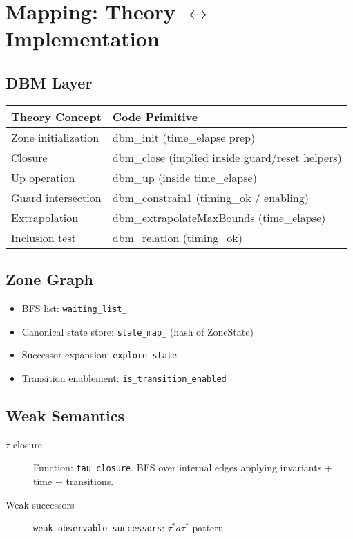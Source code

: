 \section{Mapping: Theory \texorpdfstring{$\leftrightarrow$}{<->} Implementation}
\subsection{DBM Layer}
\begin{tabular}{ll}
Theory Concept & Code Primitive \\\hline
Zone initialization & dbm\_init \newline (time\_elapse prep) \\
Closure & dbm\_close (implied inside guard/reset helpers) \\
Up operation & dbm\_up (inside time\_elapse) \\
Guard intersection & dbm\_constrain1 (timing\_ok / enabling) \\
Extrapolation & dbm\_extrapolateMaxBounds (time\_elapse) \\
Inclusion test & dbm\_relation (timing\_ok) \\
\end{tabular}

\subsection{Zone Graph}
\begin{itemize}
  \item BFS list: \texttt{waiting\_list\_}
  \item Canonical state store: \texttt{state\_map\_} (hash of ZoneState)
  \item Successor expansion: \texttt{explore\_state}
  \item Transition enablement: \texttt{is\_transition\_enabled}
\end{itemize}

\subsection{Weak Semantics}
\begin{description}
  \item[$\tau$-closure] Function: \texttt{tau\_closure}. BFS over internal edges applying invariants + time + transitions.
  \item[Weak successors] \texttt{weak\_observable\_successors}: $\tau^* a \tau^*$ pattern.
\end{description}


